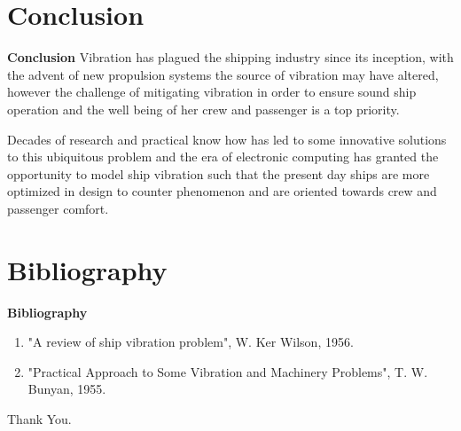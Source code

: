 \documentclass{beamer}
\begin{document}
\section{Conclusion}
	\begin{frame}[t]{\textbf{Conclusion}}\vspace{10pt}
	Vibration has plagued the shipping industry since its 				inception, with the advent of new propulsion systems the 			source of vibration may have altered, however the challenge 		of mitigating vibration in order to ensure sound ship 				operation and the well being
	of her crew and passenger is a top priority.\vspace{5pt}

	Decades of research and practical know how has led to some 			innovative solutions to this ubiquitous problem and the era 		of electronic computing has granted the opportunity to model 		ship vibration such that the present day ships are more 			optimized in design to counter phenomenon and are oriented 			towards crew and passenger comfort.
	\end{frame}

\section{Bibliography}
	\begin{frame}[t]{\textbf{Bibliography}}\vspace{10pt}
	\begin{enumerate}
	\item "A review of ship vibration problem", W. Ker Wilson, 			1956.
	\item "Practical Approach to Some Vibration and Machinery 			Problems", T. W. Bunyan, 1955.
	\end{enumerate}
	\end{frame}


\begin{frame}[standout]
\begin{center}
Thank You.
\end{center}
\end{frame}
\end{document}
